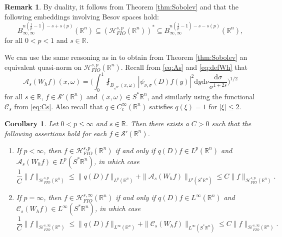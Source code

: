 \documentclass{amsart}
\newcommand {\A}{{\mathcal{A}}}
\newcommand {\Ca}{\mathcal{C}}
\newcommand {\ud}{\mathrm{d}}
\newcommand {\HT}{\mathcal{H}}
\newcommand {\Hps}{\mathcal{H}^{s,p}_{FIO}(\Rn)}
\newcommand {\R}{\mathbb R}
\newcommand {\Rn}{\mathbb{R}^{n}}
\newcommand {\Sp}{S^{*}\Rn}
\newcommand {\Sw}{\mathcal{S}}
\newcommand {\w}{\omega}
\newtheorem{corollary}[theorem]{Corollary}
\theoremstyle{definition}
\newtheorem{remark}[theorem]{Remark}
\numberwithin{equation}{section}
\begin{document}
\begin{remark}\label{rem:Sobolevdual}
By duality, it follows from Theorem \ref{thm:Sobolev} and \cite[Theorems 2.5.8.1 and 2.11.3]{Triebel10} that the following embeddings involving Besov spaces hold:
\[
B^{n(\frac{1}{p}-1)-s+s(p)}_{\infty,\infty}(\Rn)\subseteq (\Hps)^{*}\subseteq B^{n(\frac{1}{p}-1)-s-s(p)}_{\infty,\infty}(\Rn),
\]
for all $0<p<1$ and $s\in\R$.
\end{remark}

We can use the same reasoning as in \cite[Corollary 7.6]{HaPoRo20} to obtain from Theorem \ref{thm:Sobolev} an equivalent quasi-norm on $\Hps$. Recall from \eqref{eq:As} and \eqref{eq:defWh} that
\[
\A_{s}(W_{h}f)(x,\w)=\Big(\int_{0}^{1}\fint_{B_{\sqrt{\sigma}}(x,\w)}|\psi_{\nu,\sigma}(D)f(y)|^{2}\ud y\ud\nu\frac{\ud\sigma}{\sigma^{1+2s}}\Big)^{1/2}
\]
for all $s\in\R$, $f\in\Sw'(\Rn)$ and $(x,\w)\in\Sp$, and similarly using the functional $\Ca_{s}$ from \eqref{eq:Cs}. Also recall that $q\in C^{\infty}_{c}(\Rn)$ satisfies $q(\xi)=1$ for $|\xi|\leq 2$.

\begin{corollary}\label{cor:equivalentnorm}
Let $0<p\leq \infty$ and $s\in\R$. Then there exists a $C>0$ such that the following assertions hold for each $f\in\Sw'(\Rn)$.
\begin{enumerate}
\item If $p<\infty$, then $f\in\Hps$ if and only if $q(D)f\in L^{p}(\Rn)$ and $\A_{s}(W_{h}f)\in L^{p}(\Sp)$, in which case 
\[
\frac{1}{C}\|f\|_{\Hps}\leq \|q(D)f\|_{L^{p}(\Rn)}+\|\A_{s}(W_{h}f)\|_{L^{p}(\Sp)}\leq C\|f\|_{\Hps}.
\]
\item If $p=\infty$, then $f\in\HT^{s,\infty}_{FIO}(\Rn)$ if and only if $q(D)f\in L^{\infty}(\Rn)$ and $\Ca_{s}(W_{h}f)\in L^{\infty}(\Sp)$, in which case
\[
\frac{1}{C}\|f\|_{\HT^{s,\infty}_{FIO}(\Rn)}\leq \|q(D)f\|_{L^{\infty}(\Rn)}+\|\Ca_{s}(W_{h}f)\|_{L^{\infty}(\Sp)}\leq C\|f\|_{\HT^{s,\infty}_{FIO}(\Rn)}.
\]
\end{enumerate}
\end{corollary}
\end{document}
